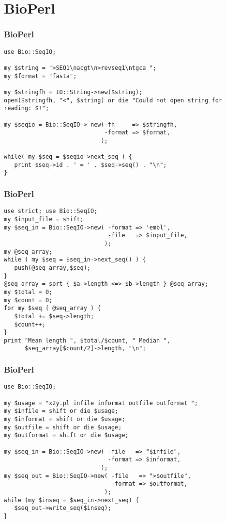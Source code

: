 \section{BioPerl}
\begin{frame}[fragile]
  \frametitle{BioPerl}
\begin{lstlisting}[basicstyle=\footnotesize\tt,numberstyle=\scriptsize]
use Bio::SeqIO;

my $string = ">SEQ1\nacgt\n>revseq1\ntgca "; 
my $format = "fasta";

my $stringfh = IO::String->new($string); 
open($stringfh, "<", $string) or die "Could not open string for reading: $!";

my $seqio = Bio::SeqIO-> new(-fh     => $stringfh,
                             -format => $format,
                            );

while( my $seq = $seqio->next_seq ) {
   print $seq->id . ' = ' . $seq->seq() . "\n"; 
}
\end{lstlisting}
\end{frame}

\begin{frame}[fragile]
  \frametitle{BioPerl}
\begin{lstlisting}[basicstyle=\footnotesize\tt,numberstyle=\scriptsize]
use strict; use Bio::SeqIO;
my $input_file = shift;
my $seq_in = Bio::SeqIO->new( -format => 'embl',
                              -file   => $input_file,
                             );
my @seq_array; 
while ( my $seq = $seq_in->next_seq() ) {
   push(@seq_array,$seq);
}
@seq_array = sort { $a->length <=> $b->length } @seq_array;
my $total = 0; 
my $count = 0; 
for my $seq ( @seq_array ) {
   $total += $seq->length;
   $count++;
}
print "Mean length ", $total/$count, " Median ", 
      $seq_array[$count/2]->length, "\n";
\end{lstlisting}
\end{frame}

\begin{frame}[fragile]
  \frametitle{BioPerl}
\begin{lstlisting}[basicstyle=\footnotesize\tt,numberstyle=\scriptsize]
use Bio::SeqIO;

my $usage = "x2y.pl infile informat outfile outformat "; 
my $infile = shift or die $usage; 
my $informat = shift or die $usage; 
my $outfile = shift or die $usage; 
my $outformat = shift or die $usage;

my $seq_in = Bio::SeqIO->new( -file   => "$infile",
                              -format => $informat,
                            );
my $seq_out = Bio::SeqIO->new( -file   => ">$outfile",
                               -format => $outformat,
                             );
while (my $inseq = $seq_in->next_seq) {
   $seq_out->write_seq($inseq);
}
\end{lstlisting}
\end{frame}

